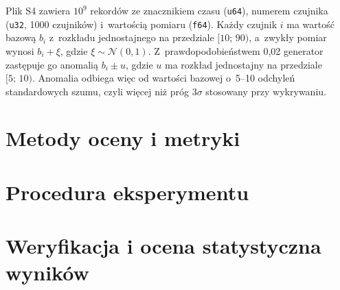 Plik S4 zawiera $10^9$ rekordów ze znacznikiem czasu (\texttt{u64}), numerem czujnika (\texttt{u32}, 1000 czujników) i~wartością pomiaru (\texttt{f64}).
Każdy czujnik $i$ ma wartość bazową $b_i$ z~rozkładu jednostajnego na przedziale $[10;\, 90)$, a~zwykły pomiar wynosi $b_i + \xi$, gdzie $\xi \sim \mathcal{N}(0, 1)$.
Z~prawdopodobieństwem 0,02 generator zastępuje go anomalią $b_i \pm u$, gdzie $u$ ma rozkład jednostajny na przedziale $[5;\, 10)$.
Anomalia odbiega więc od wartości bazowej o~5--10 odchyleń standardowych szumu, czyli więcej niż próg $3\sigma$ stosowany przy wykrywaniu.

\section{Metody oceny i metryki}
\label{sec:metryki}


\section{Procedura eksperymentu}
\label{sec:procedura}


\section{Weryfikacja i ocena statystyczna wyników}
\label{sec:weryfikacja}


